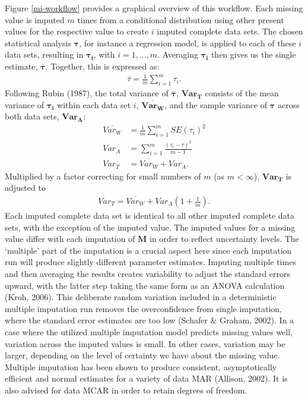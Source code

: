 \documentclass[12pt,econ]{sources/authesis}
\begin{document}
Figure \ref{mi-workflow} provides a graphical overview of this workflow. Each missing value is imputed \(m\) times from a conditional distribution using other present values for the respective value to create \(i\) imputed complete data sets. The chosen statistical analysis \(\bm{\tau}\), for instance a regression model, is applied to each of these \(i\) data sets, resulting in \(\bm{\tau_{i}}\), with \(i = 1, ..., m\). Averaging \(\bm{\tau_{i}}\) then gives us the single estimate, \(\bm{\overline{\tau}}\). Together, this is expressed as:
\begin{align}
\overline{\tau} = \frac{1}{m}\sum\limits_{i=1}^{m} \tau_{i}.
\end{align}
Following Rubin (1987), the total variance of \(\bm{\overline{\tau}}\), \(\bm{Var_T}\) consists of the mean variance of \(\bm{\tau_i}\) within each data set \(i\), \(\bm{\overline{Var_W}}\), and the sample variance of \(\bm{\tau}\) across both data sets, \(\bm{Var_A}\):
\begin{align}
\overline{Var_W} &= \frac{1}{m} \sum\limits_{i=1}^{m} SE(\tau_i)^2\\
Var_A &= \sum\limits_{i=1}^{m} \frac{(\tau_{i} - \overline{\tau})^2}{m -1}\\
Var_T &= \overline{Var_W} + Var_A.
\end{align}
Multiplied by a factor correcting for small numbers of \(m\) (as \(m < \infty\)), \(\bm{Var_T}\) is adjusted to
\begin{align}
Var_T = \overline{Var_W} + Var_A (1 + \frac{1}{m}).
\end{align}
Each imputed complete data set is identical to all other imputed complete data sets, with the exception of the imputed value. The imputed values for a missing value differ with each imputation of \(\bm{M}\) in order to reflect uncertainty levels. The `multiple' part of the imputation is a crucial aspect here since each imputation run will produce slightly different parameter estimates. Imputing multiple times and then averaging the results creates variability to adjust the standard errors upward, with the latter step taking the same form as an ANOVA calculation (Kroh, 2006). This deliberate random variation included in a deterministic multiple imputation run removes the overconfidence from single imputation, where the standard error estimates are too low (Schafer \& Graham, 2002). In a case where the utilized multiple imputation model predicts missing values well, variation across the imputed values is small. In other cases, variation may be larger, depending on the level of certainty we have about the missing value. Multiple imputation has been shown to produce consistent, asymptotically efficient and normal estimates for a variety of data MAR (Allison, 2002). It is also advised for data MCAR in order to retain degrees of freedom.
\end{document}
